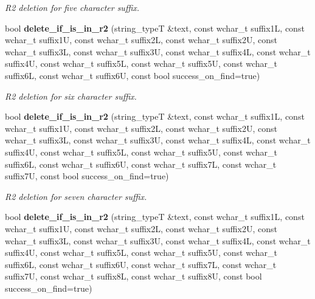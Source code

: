\begin{DoxyCompactItemize}
\begin{DoxyCompactList}\small\item\em R2 deletion for five character suffix. \end{DoxyCompactList}\item 
bool {\bf delete\+\_\+if\+\_\+is\+\_\+in\+\_\+r2} (string\+\_\+typeT \&text, const wchar\+\_\+t suffix1L, const wchar\+\_\+t suffix1U, const wchar\+\_\+t suffix2L, const wchar\+\_\+t suffix2U, const wchar\+\_\+t suffix3L, const wchar\+\_\+t suffix3U, const wchar\+\_\+t suffix4L, const wchar\+\_\+t suffix4U, const wchar\+\_\+t suffix5L, const wchar\+\_\+t suffix5U, const wchar\+\_\+t suffix6L, const wchar\+\_\+t suffix6U, const bool success\+\_\+on\+\_\+find=true)\label{classstemming_1_1stem_a95aca52d1f624638130a9d1c66570edb}

\begin{DoxyCompactList}\small\item\em R2 deletion for six character suffix. \end{DoxyCompactList}\item 
bool {\bf delete\+\_\+if\+\_\+is\+\_\+in\+\_\+r2} (string\+\_\+typeT \&text, const wchar\+\_\+t suffix1L, const wchar\+\_\+t suffix1U, const wchar\+\_\+t suffix2L, const wchar\+\_\+t suffix2U, const wchar\+\_\+t suffix3L, const wchar\+\_\+t suffix3U, const wchar\+\_\+t suffix4L, const wchar\+\_\+t suffix4U, const wchar\+\_\+t suffix5L, const wchar\+\_\+t suffix5U, const wchar\+\_\+t suffix6L, const wchar\+\_\+t suffix6U, const wchar\+\_\+t suffix7L, const wchar\+\_\+t suffix7U, const bool success\+\_\+on\+\_\+find=true)\label{classstemming_1_1stem_a9542e67a264c728cfb636767dc75a07c}

\begin{DoxyCompactList}\small\item\em R2 deletion for seven character suffix. \end{DoxyCompactList}\item 
bool {\bf delete\+\_\+if\+\_\+is\+\_\+in\+\_\+r2} (string\+\_\+typeT \&text, const wchar\+\_\+t suffix1L, const wchar\+\_\+t suffix1U, const wchar\+\_\+t suffix2L, const wchar\+\_\+t suffix2U, const wchar\+\_\+t suffix3L, const wchar\+\_\+t suffix3U, const wchar\+\_\+t suffix4L, const wchar\+\_\+t suffix4U, const wchar\+\_\+t suffix5L, const wchar\+\_\+t suffix5U, const wchar\+\_\+t suffix6L, const wchar\+\_\+t suffix6U, const wchar\+\_\+t suffix7L, const wchar\+\_\+t suffix7U, const wchar\+\_\+t suffix8L, const wchar\+\_\+t suffix8U, const bool success\+\_\+on\+\_\+find=true)\label{classstemming_1_1stem_a9bbc2192839ce8ebcf88d0220cfa2441}


\end{DoxyCompactItemize}
